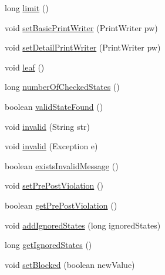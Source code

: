 \begin{DoxyCompactItemize}
\item 
long \hyperlink{classorg_1_1tzi_1_1use_1_1gen_1_1tool_1_1_g_collector_impl_afda25f50ed09e01f9ee09924c496c071}{limit} ()
\item 
void \hyperlink{classorg_1_1tzi_1_1use_1_1gen_1_1tool_1_1_g_collector_impl_a2cc78660c7a9f1f830c9d0bcd5b02313}{set\-Basic\-Print\-Writer} (Print\-Writer pw)
\item 
void \hyperlink{classorg_1_1tzi_1_1use_1_1gen_1_1tool_1_1_g_collector_impl_af1dca9545fb899481e23bd05e78c5850}{set\-Detail\-Print\-Writer} (Print\-Writer pw)
\item 
void \hyperlink{classorg_1_1tzi_1_1use_1_1gen_1_1tool_1_1_g_collector_impl_a4e8ee7c39a24f927a4172b76335009ef}{leaf} ()
\item 
long \hyperlink{classorg_1_1tzi_1_1use_1_1gen_1_1tool_1_1_g_collector_impl_a289de976515b5510b9bdea9d44cc9e1a}{number\-Of\-Checked\-States} ()
\item 
boolean \hyperlink{classorg_1_1tzi_1_1use_1_1gen_1_1tool_1_1_g_collector_impl_a2fe9389f5363ccd02377d0fc80ac4077}{valid\-State\-Found} ()
\item 
void \hyperlink{classorg_1_1tzi_1_1use_1_1gen_1_1tool_1_1_g_collector_impl_a35c4dea616a425e5a9e08f1e7bada8b6}{invalid} (String str)
\item 
void \hyperlink{classorg_1_1tzi_1_1use_1_1gen_1_1tool_1_1_g_collector_impl_aac7616aec7dd4cae2446a062897b3618}{invalid} (Exception e)
\item 
boolean \hyperlink{classorg_1_1tzi_1_1use_1_1gen_1_1tool_1_1_g_collector_impl_a8c43ef64963cc4a06bc9abc960e11cba}{exists\-Invalid\-Message} ()
\item 
void \hyperlink{classorg_1_1tzi_1_1use_1_1gen_1_1tool_1_1_g_collector_impl_a2a60280b0922c783575bb06a0e2b89a9}{set\-Pre\-Post\-Violation} ()
\item 
boolean \hyperlink{classorg_1_1tzi_1_1use_1_1gen_1_1tool_1_1_g_collector_impl_ae038a80377ff867d7ef4877c77f79780}{get\-Pre\-Post\-Violation} ()
\item 
void \hyperlink{classorg_1_1tzi_1_1use_1_1gen_1_1tool_1_1_g_collector_impl_afca7db09374f4bedd11ef5c225f0d9dd}{add\-Ignored\-States} (long ignored\-States)
\item 
long \hyperlink{classorg_1_1tzi_1_1use_1_1gen_1_1tool_1_1_g_collector_impl_a8349328dfdb67a381caca4f39b466670}{get\-Ignored\-States} ()
\item 
void \hyperlink{classorg_1_1tzi_1_1use_1_1gen_1_1tool_1_1_g_collector_impl_a150db5033475b55a098ccaaaf6fb061c}{set\-Blocked} (boolean new\-Value)

\end{DoxyCompactItemize}
